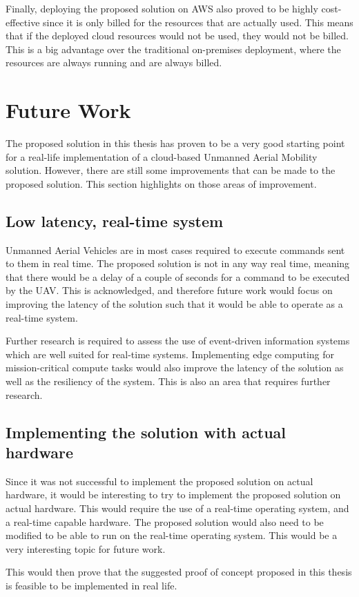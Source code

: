 Finally, deploying the proposed solution on AWS also proved to be highly cost-effective since it is only billed for the resources that are actually used. This means that if the deployed cloud resources would not be used, they would not be billed. This is a big advantage over the traditional on-premises deployment, where the resources are always running and are always billed.



\section{Future Work}
\label{sec:future-work}

The proposed solution in this thesis has proven to be a very good starting point for a real-life implementation of a cloud-based Unmanned Aerial Mobility solution. However, there are still some improvements that can be made to the proposed solution. This section highlights on those areas of improvement.

\subsection{Low latency, real-time system}
Unmanned Aerial Vehicles are in most cases required to execute commands sent to them in real time. The proposed solution is not in any way real time, meaning that there would be a delay of a couple of seconds for a command to be executed by the UAV. This is acknowledged, and therefore future work would focus on improving the latency of the solution such that it would be able to operate as a real-time system.

Further research is required to assess the use of event-driven information systems which are well suited for real-time systems. Implementing edge computing for mission-critical compute tasks would also improve the latency of the solution as well as the resiliency of the system. This is also an area that requires further research.

\subsection{Implementing the solution with actual hardware}
Since it was not successful to implement the proposed solution on actual hardware, it would be interesting to try to implement the proposed solution on actual hardware. This would require the use of a real-time operating system, and a real-time capable hardware. The proposed solution would also need to be modified to be able to run on the real-time operating system. This would be a very interesting topic for future work.

This would then prove that the suggested proof of concept proposed in this thesis is feasible to be implemented in real life.
